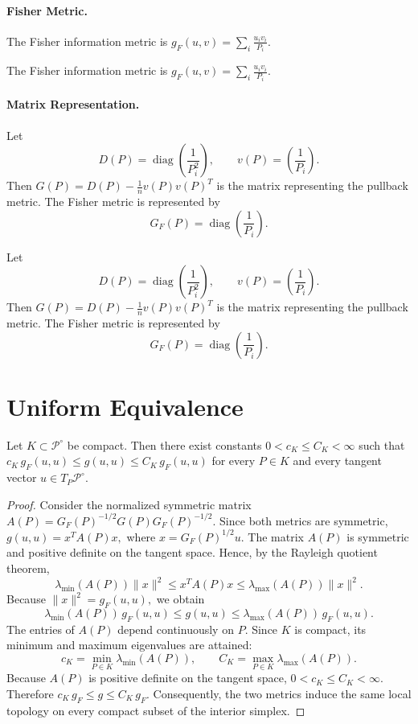 \paragraph{Fisher Metric.}
The Fisher information metric is
$g_F(u,v) = \sum_i\frac{u_iv_i}{P_i}.$


The Fisher information metric is
$g_F(u,v) = \sum_i\frac{u_iv_i}{P_i}.$
\paragraph{Matrix Representation.}
Let
\[
D(P)=\operatorname{diag}\!\left(\frac1{P_i^2}\right),
\qquad v(P)=\left(\frac1{P_i}\right).
\]
Then
$G(P) = D(P)-\frac1n v(P)v(P)^T$
is the matrix representing the pullback metric.
The Fisher metric is represented by
\[
G_F(P)=\operatorname{diag}\!\left(\frac1{P_i}\right).
\]


Let
\[
D(P)=\operatorname{diag}\!\left(\frac1{P_i^2}\right),
\qquad v(P)=\left(\frac1{P_i}\right).
\]
Then
$G(P) = D(P)-\frac1n v(P)v(P)^T$
is the matrix representing the pullback metric.
The Fisher metric is represented by
\[
G_F(P)=\operatorname{diag}\!\left(\frac1{P_i}\right).
\]
\section{Uniform Equivalence}
\begin{theorem}
\label{ch:thm:25-3}
Let \(K\subset\mathcal P^\circ\) be compact.
Then there exist constants
$0<c_K\le C_K<\infty$
such that
$c_K\,g_F(u,u) \le g(u,u) \le C_K\,g_F(u,u)$
for every \(P\in K\) and every tangent vector
\(u\in T_P\mathcal P^\circ\).
\end{theorem}
\begin{proof}
Consider the normalized symmetric matrix
$A(P) = G_F(P)^{-1/2} G(P) G_F(P)^{-1/2}.$
Since both metrics are symmetric,
$g(u,u) = x^T A(P) x,$
where
$x = G_F(P)^{1/2}u.$
The matrix \(A(P)\) is symmetric and positive definite on the tangent
space. Hence, by the Rayleigh quotient theorem,
\[ \lambda_{\min}(A(P)) \|x\|^2 \le x^T A(P) x
\le \lambda_{\max}(A(P)) \|x\|^2. \]
Because
$\|x\|^2 = g_F(u,u),$
we obtain
\[ \lambda_{\min}(A(P))\,g_F(u,u) \le g(u,u)
\le \lambda_{\max}(A(P))\,g_F(u,u). \]
The entries of \(A(P)\) depend continuously on \(P\). Since \(K\) is compact,
its minimum and maximum eigenvalues are attained:
\[ c_K =
\min_{P\in K}\lambda_{\min}(A(P)),
\qquad C_K =
\max_{P\in K}\lambda_{\max}(A(P)). \]
Because \(A(P)\) is positive definite on the tangent space,
$0<c_K\le C_K<\infty.$
Therefore
$c_K\,g_F \le g \le C_K\,g_F.$
Consequently, the two metrics induce the same local topology on every
compact subset of the interior simplex. 
\end{proof}
